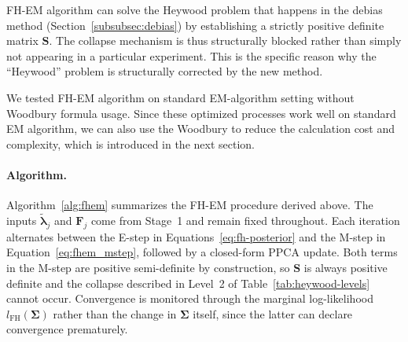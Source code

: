 FH-EM algorithm can solve the Heywood problem that happens in the debias method (Section~\ref{subsubsec:debias}) by establishing a strictly positive definite matrix $\mathbf{S}$. The collapse mechanism is thus structurally blocked rather than simply not appearing in a particular experiment. This is the specific reason why the ``Heywood'' problem is structurally corrected by the new method.

We tested FH-EM algorithm on standard EM-algorithm setting without Woodbury formula usage. Since these optimized processes work well on standard EM algorithm, we can also use the Woodbury to reduce the calculation cost and complexity, which is introduced in the next section. 

\paragraph*{Algorithm.}
\label{para:fhem-algorithm}
Algorithm~\ref{alg:fhem} summarizes the FH-EM procedure derived above. The inputs $\tilde{\bm{\lambda}}_j$ and $\mathbf{F}_j$ come from Stage~1 and remain fixed throughout. Each iteration alternates between the E-step in Equations~\eqref{eq:fh-posterior} and the M-step in Equation~\eqref{eq:fhem_mstep}, followed by a closed-form PPCA update. Both terms in the M-step are positive semi-definite by construction, so $\mathbf{S}$ is always positive definite and the collapse described in Level~2 of Table~\ref{tab:heywood-levels} cannot occur.
Convergence is monitored through the marginal log-likelihood $l_{\text{FH}}(\bm{\Sigma})$ rather than the change in $\bm{\Sigma}$ itself, since the latter can declare convergence prematurely.

